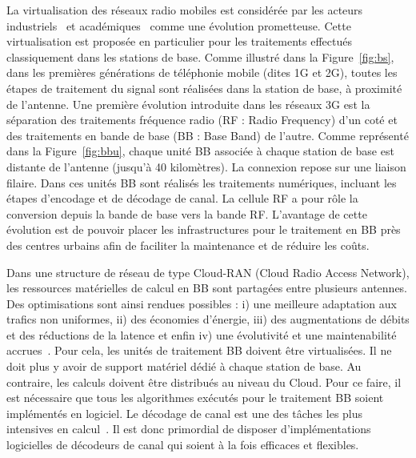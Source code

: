 La virtualisation des réseaux radio mobiles est considérée par les acteurs industriels~\cite{ericsson_cloud_2015,huawei_5g:_2013} et académiques~\cite{wubben_benefits_2014,rost_cloud_2014,checko_cloud_2015} comme une évolution prometteuse. Cette virtualisation est proposée en particulier pour les traitements effectués classiquement dans les stations de base. Comme illustré dans la Figure~\ref{fig:bs}, dans les premières générations de téléphonie mobile (dites 1G et 2G), toutes les étapes de traitement du signal sont réalisées dans la station de base, à proximité de l'antenne. Une première évolution introduite dans les réseaux 3G est la séparation des traitements fréquence radio (RF : Radio Frequency) d'un coté et des traitements en bande de base (BB : Base Band) de l'autre. Comme représenté dans la Figure~\ref{fig:bbu}, chaque unité BB associée à chaque station de base est distante de l'antenne (jusqu'à 40 kilomètres). La connexion repose sur une liaison filaire. Dans ces unités BB sont réalisés les traitements numériques, incluant les étapes d'encodage et de décodage de canal. La cellule RF a pour rôle la conversion depuis la bande de base vers la bande RF. L'avantage de cette évolution est de pouvoir placer les infrastructures pour le traitement en BB près des centres urbains afin de faciliter la maintenance et de réduire les coûts.

Dans une structure de réseau de type Cloud-RAN (Cloud Radio Access Network), les ressources matérielles de calcul en BB sont partagées entre plusieurs antennes. Des optimisations sont ainsi rendues possibles : i) une meilleure adaptation aux trafics non uniformes, ii) des économies d'énergie, iii) des augmentations de débits et des réductions de la latence et enfin iv) une évolutivité et une maintenabilité accrues~\cite{checko_cloud_2015}. Pour cela, les unités de traitement BB doivent être virtualisées. Il ne doit plus y avoir de support matériel dédié à chaque station de base. Au contraire, les calculs doivent être distribués au niveau du Cloud. Pour ce faire, il est nécessaire que tous les algorithmes exécutés pour le traitement BB soient implémentés en logiciel. Le décodage de canal est une des tâches les plus intensives en calcul~\cite{rodriguez_towards_2017,nikaein_processing_2015}. Il est donc primordial de disposer d'implémentations logicielles de décodeurs de canal qui soient à la fois efficaces et flexibles.

